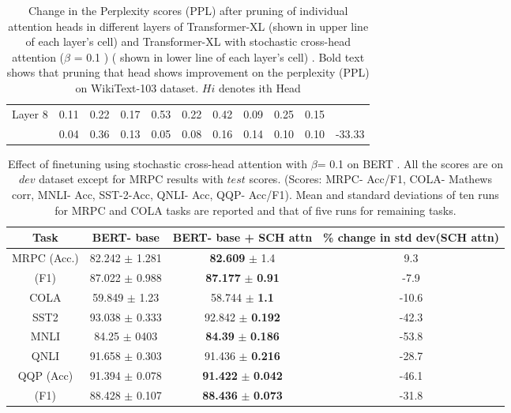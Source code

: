 \documentclass[11pt]{article}
\begin{document}
\begin{table*}
\begin{tabular}{c|cccccccccc}
Layer 8 &  0.11 & 0.22 & 0.17 & 0.53 & 0.22 & 0.42 & 0.09 & 0.25 & 0.15 \\
 & 0.04 & 0.36 & 0.13 & 0.05 & 0.08 & 0.16 &  0.14 & 0.10 & 0.10 &-33.33\\

\hline
\end{tabular}
\caption{
Change in the Perplexity scores (PPL) after pruning of individual attention heads in different layers of Transformer-XL (shown in upper line of each layer's cell) and Transformer-XL with stochastic cross-head attention ($\beta$ = 0.1 ) ( shown in lower line of each layer's cell) . Bold text shows that pruning that head shows improvement on the perplexity (PPL) on WikiText-103 dataset. $Hi$ denotes ith Head
}
\label{table:prune}
\end{table*}










\begin{table*}
\centering
\begin{tabular}{cccc}
\hline
Task &  \textbf{BERT- base} &  \textbf{BERT- base + SCH attn} & \textbf{\% change in std dev(SCH attn)} \\
\hline
MRPC (Acc.) &  82.242  $ \pm$  1.281 &  \textbf{82.609}  $\pm$ 1.4  & 9.3\\
\hfill (F1) & 87.022  $ \pm $  0.988 &  \textbf{87.177} $\pm$ \textbf{0.91}  & -7.9   \\
COLA & 59.849 $\pm$ 1.23 & 58.744 $\pm$ \textbf{1.1} & -10.6 \\
SST2  &  93.038 $\pm$ 0.333  &  92.842 $\pm$  \textbf{0.192} & -42.3\\
MNLI & 84.25 $\pm$ 0403 &  \textbf{84.39} $\pm$ \textbf{0.186} & -53.8\\
QNLI & 91.658 $\pm$ 0.303 &  91.436 $\pm$ \textbf{0.216} & -28.7\\
QQP (Acc) &  91.394 $\pm$ 0.078 &  \textbf{91.422} $\pm$ \textbf{0.042} & -46.1 \\
\hfill (F1) & 88.428 $\pm$ 0.107 &   \textbf{88.436} $\pm$ \textbf{0.073} & -31.8\\ 

\hline


\end{tabular}
\caption{
Effect of finetuning using stochastic cross-head attention with $\beta$= 0.1 on BERT \citep{DBLP:conf/naacl/DevlinCLT19}. All the scores are on $dev$ dataset except for MRPC results with $test$ scores. (Scores: MRPC- Acc/F1, COLA- Mathews corr, MNLI- Acc, SST-2-Acc, QNLI- Acc, QQP- Acc/F1). Mean and standard deviations of ten runs for MRPC and COLA tasks are reported and that of five runs for remaining tasks.
}
\label{table:bert}
\end{table*}
\end{document}
